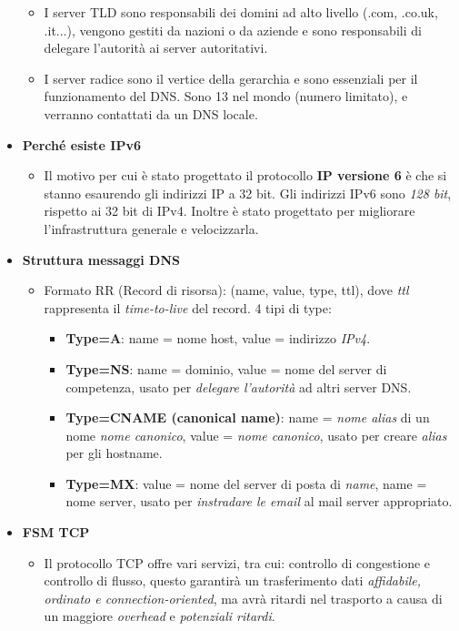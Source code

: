 \begin{itemize}
\begin{itemize}
            \item I server TLD sono responsabili dei domini ad alto livello (.com, .co.uk, .it...), vengono gestiti da nazioni o da aziende e sono responsabili di delegare l'autorità ai server autoritativi.
            \item I server radice sono il vertice della gerarchia e sono essenziali per il funzionamento del DNS. Sono 13 nel mondo (numero limitato), e verranno contattati da un DNS locale.
        \end{itemize}
    \item \textbf{Perché esiste IPv6}
        \begin{itemize}
            \item Il motivo per cui è stato progettato il protocollo \textbf{IP versione 6} è che si stanno esaurendo gli indirizzi IP a 32 bit. Gli indirizzi IPv6 sono \textit{128 bit}, rispetto ai 32 bit di IPv4. Inoltre è stato progettato per migliorare l'infrastruttura generale e velocizzarla.
        \end{itemize}
    \item \textbf{Struttura messaggi DNS}
        \begin{itemize}
            \item Formato RR (Record di risorsa): (name, value, type, ttl), dove \textit{ttl} rappresenta il \textit{time-to-live} del record. 4 tipi di type:
                \begin{itemize}
                    \item \textbf{Type=A}: name = nome host, value = indirizzo \textit{IPv4}.
                    \item \textbf{Type=NS}: name = dominio, value = nome del server di competenza, usato per \textit{delegare l'autorità} ad altri server DNS.
                    \item \textbf{Type=CNAME (canonical name)}: name = \textit{nome alias} di un nome \textit{nome canonico}, value = \textit{nome canonico}, usato per creare \textit{alias} per gli hostname.
                    \item \textbf{Type=MX}: value = nome del server di posta di \textit{name}, name = nome server, usato per \textit{instradare le email} al mail server appropriato.
                \end{itemize}
        \end{itemize}
    \item \textbf{FSM TCP}
        \begin{itemize}
            \item Il protocollo TCP offre vari servizi, tra cui: controllo di congestione e controllo di flusso, questo garantirà un trasferimento dati \textit{affidabile, ordinato e connection-oriented}, ma avrà ritardi nel trasporto a causa di un maggiore \textit{overhead} e \textit{potenziali ritardi}.

\end{itemize}
\end{itemize}
